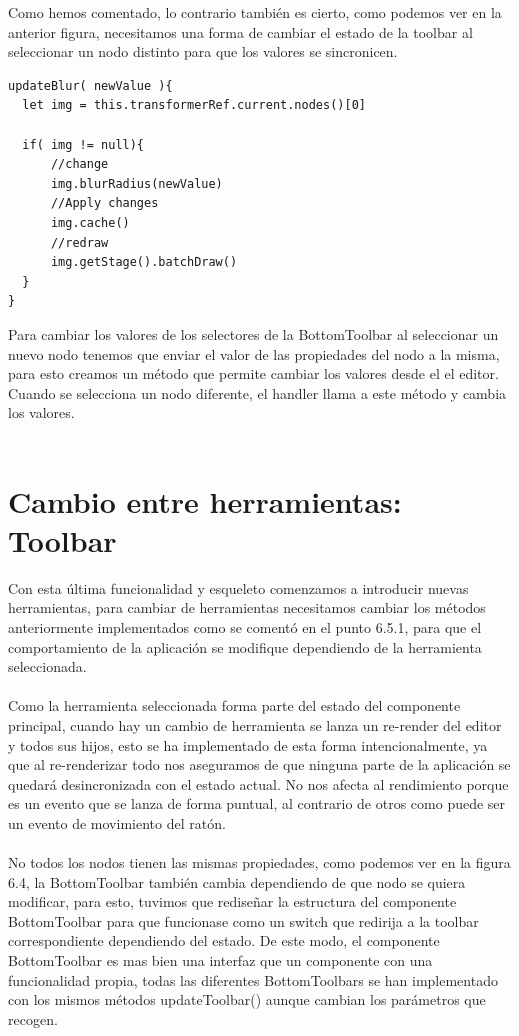 Como hemos comentado, lo contrario también es cierto, como podemos ver en la anterior figura, 
necesitamos una forma de cambiar el estado de la toolbar al seleccionar un nodo distinto
para que los valores se sincronicen.

\newpage

\begin{lstlisting}[caption={Ejemplo de una función updater de la propiedad de un nodo}]
updateBlur( newValue ){
  let img = this.transformerRef.current.nodes()[0]

  if( img != null){
      //change
      img.blurRadius(newValue)
      //Apply changes
      img.cache()
      //redraw
      img.getStage().batchDraw()
  }
}
\end{lstlisting}

Para cambiar los valores de los selectores de la BottomToolbar al seleccionar un nuevo nodo
tenemos que enviar el valor de las propiedades del nodo a la misma, para esto creamos un 
método que permite cambiar los valores desde el el editor. Cuando se selecciona un nodo
diferente, el handler llama a este método y cambia los valores.
\\\\

\section{Cambio entre herramientas: Toolbar}

Con esta última funcionalidad y esqueleto comenzamos a introducir nuevas herramientas, para 
cambiar de herramientas necesitamos cambiar los métodos anteriormente implementados como se 
comentó en el punto 6.5.1, para que el comportamiento de la aplicación se modifique dependiendo
de la herramienta seleccionada.
\\\\
Como la herramienta seleccionada forma parte del estado del componente principal, cuando hay 
un cambio de herramienta se lanza un re-render del editor y todos sus hijos, esto se ha
implementado de esta forma intencionalmente, ya que al re-renderizar todo nos aseguramos de que
ninguna parte de la aplicación se quedará desincronizada con el estado actual. No nos afecta 
al rendimiento porque es un evento que se lanza de forma puntual, al contrario de otros como
puede ser un evento de movimiento del ratón.
\\\\
No todos los nodos tienen las mismas propiedades, como podemos ver en la figura 6.4,
la BottomToolbar también cambia dependiendo de que nodo se quiera modificar, para esto, 
tuvimos que rediseñar la estructura del componente BottomToolbar para que funcionase como un 
switch que redirija a la toolbar correspondiente dependiendo del estado.
De este modo, el componente BottomToolbar es mas bien una interfaz que un componente con una 
funcionalidad propia, todas las diferentes BottomToolbars se han implementado con los mismos
métodos updateToolbar() aunque cambian los parámetros que recogen.

